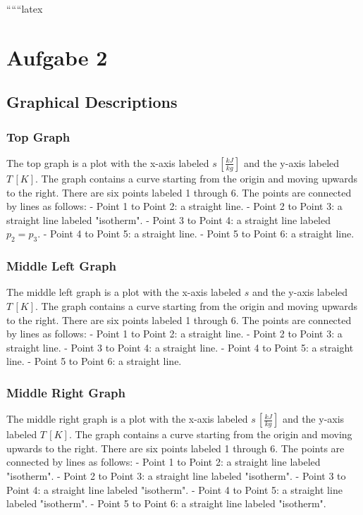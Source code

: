 
``````latex


\section*{Aufgabe 2}

\subsection*{Graphical Descriptions}

\subsubsection*{Top Graph}

The top graph is a plot with the x-axis labeled \( s \, [\frac{kJ}{kg}] \) and the y-axis labeled \( T \, [K] \). The graph contains a curve starting from the origin and moving upwards to the right. There are six points labeled 1 through 6. The points are connected by lines as follows:
- Point 1 to Point 2: a straight line.
- Point 2 to Point 3: a straight line labeled "isotherm".
- Point 3 to Point 4: a straight line labeled \( p_2 = p_3 \).
- Point 4 to Point 5: a straight line.
- Point 5 to Point 6: a straight line.

\subsubsection*{Middle Left Graph}

The middle left graph is a plot with the x-axis labeled \( s \) and the y-axis labeled \( T \, [K] \). The graph contains a curve starting from the origin and moving upwards to the right. There are six points labeled 1 through 6. The points are connected by lines as follows:
- Point 1 to Point 2: a straight line.
- Point 2 to Point 3: a straight line.
- Point 3 to Point 4: a straight line.
- Point 4 to Point 5: a straight line.
- Point 5 to Point 6: a straight line.

\subsubsection*{Middle Right Graph}

The middle right graph is a plot with the x-axis labeled \( s \, [\frac{kJ}{kg}] \) and the y-axis labeled \( T \, [K] \). The graph contains a curve starting from the origin and moving upwards to the right. There are six points labeled 1 through 6. The points are connected by lines as follows:
- Point 1 to Point 2: a straight line labeled "isotherm".
- Point 2 to Point 3: a straight line labeled "isotherm".
- Point 3 to Point 4: a straight line labeled "isotherm".
- Point 4 to Point 5: a straight line labeled "isotherm".
- Point 5 to Point 6: a straight line labeled "isotherm".

